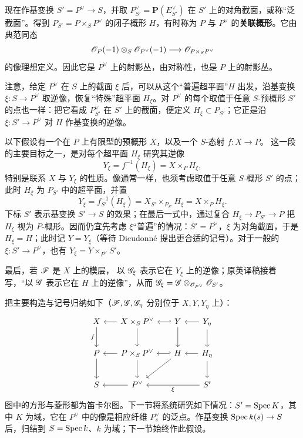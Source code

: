 现在作基变换 $S'=P^\vee\to S$，并取 $P^\vee_{S'}=\mathbf P(E^\vee_{S'})$ 在 $S'$ 上的对角截面，或称“泛截面”。得到 $P_{S'}=P\times_SP^\vee$ 的闭子概形 $H$，有时称为 $P$ 与 $P^\vee$ 的\textbf{关联概形}。它由典范同态
\[
 \mathscr O_P(-1)\otimes_S\mathscr O_{P^\vee}(-1)
 \longrightarrow\mathscr O_{P\times_SP^\vee}
\]
的像理想定义。因此它是 $P^\vee$ 上的射影丛，由对称性，也是 $P$ 上的射影丛。

注意，给定 $P^\vee$ 在 $S$ 上的截面 $\xi$ 后，可以从这个“普遍超平面”$H$ 出发，沿基变换 $\xi:S\to P^\vee$ 取逆像，恢复“特殊”超平面 $H_\xi$。对 $P^\vee$ 的每个取值于任意 $S$-预概形 $S'$ 的点也一样：把它看成 $P^\vee_{S'}$ 在 $S'$ 上的截面，便定义 $H_\xi\subset P_{S'}$；它正是沿 $\xi:S'\to P^\vee$ 对 $H$ 作基变换的逆像。

以下假设有一个在 $P$ 上有限型的预概形 $X$，以及一个 $S$-态射 $f:X\to P$。
这一段的主要目标之一，是对每个超平面 $H_\xi$ 研究其逆像
\[
 Y_\xi=f^{-1}(H_\xi)=X\times_PH_\xi,
\]
特别是联系 $X$ 与 $Y_\xi$ 的性质。像通常一样，也须考虑取值于任意 $S$-概形 $S'$ 的点；此时 $H_\xi$ 为 $P_{S'}$ 中的超平面，并置
\[
 Y_\xi=f_{S'}^{-1}(H_\xi)=X_{S'}\times_{P_{S'}}H_\xi
       =X\times_PH_\xi.
\]
下标 $S'$ 表示基变换 $S'\to S$ 的效果；在最后一式中，通过复合 $H_\xi\to P_{S'}\to P$ 把 $H_\xi$ 视为 $P$-概形。因而仍宜先考虑 $\xi$“普遍”的情况：$S'=P^\vee$，$\xi$ 为对角截面，于是 $H_\xi=H$；此时记 $Y=Y_\xi$（等待 Dieudonné 提出更合适的记号）。对于一般的 $\xi:S'\to P^\vee$，也有 $Y_\xi=Y\times_{P^\vee}S'$。

最后，若 $\mathscr F$ 是 $X$ 上的模层，
以 $\mathscr G_\xi$ 表示它在 $Y_\xi$ 上的逆像；原英译稿接着写，“以 $\mathscr G$ 表示它在 $H$ 上的逆像”，从而 $\mathscr G_\xi=\mathscr G\otimes_{\mathscr O_{P^\vee}}\mathscr O_{S'}$。

把主要构造与记号归纳如下（$\mathscr F,\mathscr G,\mathscr G_\eta$ 分别位于 $X,Y,Y_\eta$ 上）：
\[
\begin{tikzcd}[column sep=1.6em,row sep=2.1em]
X \arrow[d,"f"'] & X\times_SP^\vee \arrow[l] \arrow[d] & Y \arrow[l,hook'] \arrow[d] & Y_\eta \arrow[l] \arrow[d]\\
P \arrow[d] & P\times_SP^\vee \arrow[l] \arrow[d] & H \arrow[l,hook'] \arrow[dl] & H_\eta \arrow[l] \arrow[d]\\
S & P^\vee \arrow[l] & & S' \arrow[ll,"\xi"]
\end{tikzcd}
\]
图中的方形与菱形都为笛卡尔图。下一节将系统研究如下情况：$S'=\operatorname{Spec} K$，其中 $K$ 为域，它在 $P^\vee$ 中的像是相应纤维 $P_s^\vee$ 的泛点。作基变换 $\operatorname{Spec} k(s)\to S$ 后，归结到 $S=\operatorname{Spec} k$、$k$ 为域；下一节始终作此假设。

